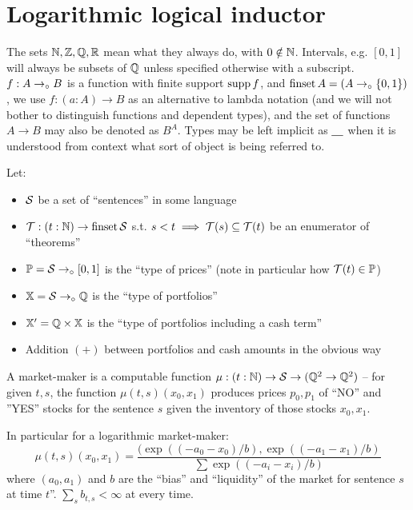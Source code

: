 \documentclass{article}
\begin{document}
\section{Logarithmic logical inductor}

\begin{notation}
    The sets $\mathbb{N},\mathbb{Z},\mathbb{Q},\mathbb{R}$ mean what they always do, with $0\notin\mathbb{N}$. Intervals, e.g. $[0,1]$ will always be subsets of $\mathbb{Q}$ unless specified otherwise with a subscript. $f:A\to_\circ B$ is a function with finite support $\supp[f]$, and $\operatorname{finset} A=(A\to_\circ\{0,1\})$, we use $f:(a:A)\to B$ as an alternative to lambda notation (and we will not bother to distinguish functions and dependent types), and the set of functions $A\to B$ may also be denoted as $B^A$. Types may be left implicit as $\underline{\quad}$ when it is understood from context what sort of object is being referred to.
\end{notation}

\begin{constants}
    Let:
    \begin{itemize}
        \item $\mathcal{S}$ be a set of ``sentences'' in some language
        \item $\mathcal{T} : (t : \mathbb{N}) \to \operatorname{finset} \mathcal{S}$ s.t. $s<t\implies\mathcal{T}(s)\subseteq\mathcal{T}(t)$ be an enumerator of ``theorems''
        \item $\mathbb{P} = \mathcal{S} \to_\circ [0, 1]$ is the ``type of prices'' (note in particular how $\mathcal{T}(t)\in\mathbb{P}$)
        \item $\mathbb{X} = \mathcal{S} \to_\circ \mathbb{Q}$ is the ``type of portfolios''
        \item $\mathbb{X}' = \mathbb{Q}\times\mathbb{X}$ is the ``type of portfolios including a cash term''
        \item Addition $(+)$ between portfolios and cash amounts in the obvious way
    \end{itemize}
\end{constants}

\begin{definition}\label{def:mm}
    A market-maker is a computable function $\mu:(t:\mathbb{N})\to\mathcal{S}\to(\mathbb{Q}^2\to\mathbb{Q}^2)$ -- for given $t, s$, the function $\mu(t,s)(x_0,x_1)$ produces prices $p_0,p_1$ of ``NO'' and ''YES'' stocks for the sentence $s$ given the inventory of those stocks $x_0,x_1$. 
    
    In particular for a logarithmic market-maker:
    \begin{equation*}
        \mu(t,s)(x_0,x_1) = \frac{(\exp((-a_0-x_0)/b), \exp((-a_1-x_1)/b)}{\sum\exp((-a_i-x_i)/b)}
    \end{equation*}
    where $(a_0, a_1)$ and $b$ are the ``bias'' and ``liquidity'' of the market for sentence $s$ at time $t$''. $\sum_s b_{t,s}<\infty$ at every time.
\end{definition}
\end{document}
